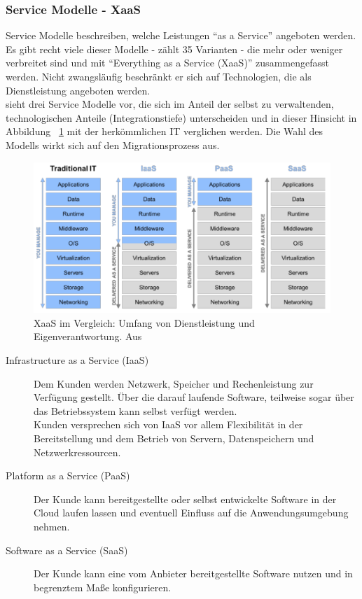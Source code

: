 \subsubsection{Service Modelle - XaaS}
Service Modelle beschreiben, welche Leistungen "`as a Service"' angeboten 
werden. Es gibt recht viele dieser Modelle -  zählt 35 
Varianten - die mehr oder weniger verbreitet sind und mit "`Everything as a 
Service (XaaS)"' zusammengefasst werden.  Nicht 
zwangsläufig beschränkt er sich auf Technologien, die als Dienstleistung 
angeboten werden.  
\\
 sieht drei Service Modelle vor, die sich im Anteil der 
selbst zu verwaltenden, technologischen Anteile (Integrationstiefe) 
unterscheiden und in dieser 
Hinsicht in Abbildung ~\ref{xaas_im_vergleich} mit der herkömmlichen IT 
verglichen werden. Die Wahl des Modells wirkt sich auf den 
Migrationsprozess aus. 
\begin{figure}[hb]
\begin{center}
\includegraphics[width=\textwidth]{images/XaaS_im_Vergleich.png}
\caption{XaaS im Vergleich: Umfang von 
Dienstleistung und Eigenverantwortung. Aus 
\protect{} }
\label{xaas_im_vergleich}
\end{center}
\end{figure}
\begin{description}
	\item[Infrastructure as a Service (IaaS)] Dem Kunden werden Netzwerk, 
Speicher und Rechenleistung zur Verfügung gestellt. Über die darauf laufende 
Software, teilweise sogar über das Betriebssystem kann selbst verfügt werden. \\
Kunden versprechen sich von IaaS vor allem Flexibilität in der Bereitstellung 
und dem Betrieb von Servern, Datenspeichern und Netzwerkressourcen. 
	\item[Platform as a Service (PaaS)] Der Kunde kann bereitgestellte 
oder selbst entwickelte Software in der Cloud laufen lassen und eventuell 
Einfluss auf die Anwendungsumgebung nehmen. \\
	\item[Software as a Service (SaaS)] Der Kunde kann eine vom Anbieter 
bereitgestellte Software nutzen und in begrenztem Maße konfigurieren.
\end{description}

